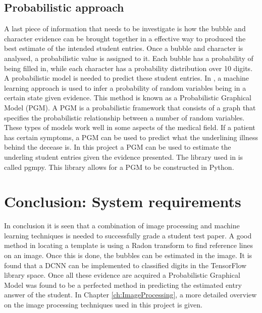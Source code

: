 \subsection{Probabilistic approach}

A last piece of information that needs to be investigate is how the bubble and character evidence can be brought together in a effective way to produced the best estimate of the intended student entries. Once a bubble and character is analysed, a probabilistic value is assigned to it. Each bubble has a probability of being filled in, while each character has a probability distribution over 10 digits. A probabilistic model is needed to predict these student entries. In \citet{pgmPy}, a machine learning approach is used to infer a probability of random variables being in a certain state given evidence. This method is known as a Probabilistic Graphical Model (PGM). A PGM is a probabilistic framework that consists of a graph that specifies the probabilistic relationship between a number of random variables. These types of models work well in some aspects of the medical field. If a patient has certain symptoms, a PGM can be used to predict what the underlining illness behind the decease is. In this project a PGM can be used to estimate the underling student entries given the evidence presented. The library used in \citet{pgmPy} is called pgmpy. This library allows for a PGM to be constructed in Python. 

\section{Conclusion: System requirements}

In conclusion it is seen that a combination of image processing and machine learning techniques is needed to successfully grade a student test paper. A good method in locating a template is using a Radon transform to find reference lines on an image. Once this is done, the bubbles can be estimated in the image. It is found that a DCNN can be implemented to classified digits in the TensorFlow library space. Once all these evidence are acquired a Probabilistic Graphical Model was found to be a perfected method in predicting the estimated entry answer of the student.
In Chapter \ref{ch:ImageProcessing}, a more detailed overview on the image processing techniques used in this project is given.
